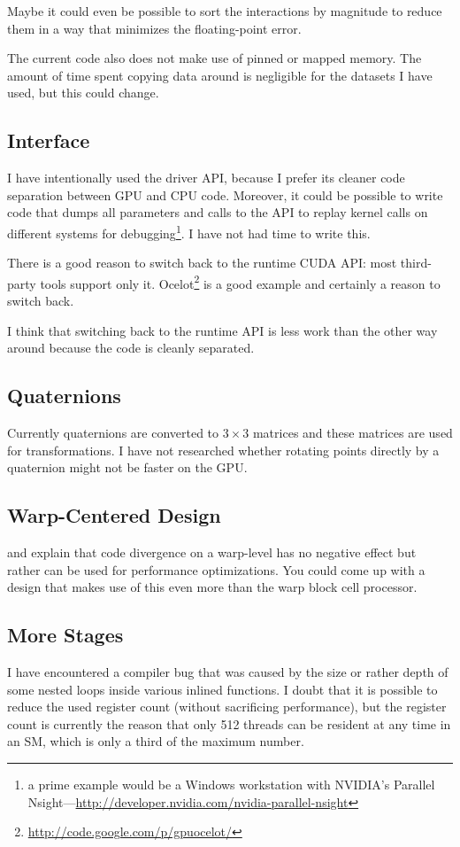Maybe it could even be possible to sort the interactions by magnitude to reduce them in a way that minimizes the floating-point error.

The current code also does not make use of pinned or mapped memory. The amount of time spent copying data around is negligible for the datasets I have used, but this could change.

\subsection{\cuda{} Interface}
I have intentionally used the driver API, because I prefer its cleaner code separation between GPU and CPU code. Moreover, it could be possible to write code that dumps all parameters and calls to the API to replay kernel calls on different systems for debugging\footnote{a prime example would be a Windows workstation with NVIDIA's Parallel Nsight---\url{http://developer.nvidia.com/nvidia-parallel-nsight}}. I have not had time to write this.

There is a good reason to switch back to the runtime CUDA API: most third-party tools support only it. Ocelot\footnote{\url{http://code.google.com/p/gpuocelot/}} is a good example and certainly a reason to switch back.

I think that switching back to the runtime API is less work than the other way around because the code is cleanly separated.

\subsection{Quaternions}
Currently quaternions are converted to $3 \times 3$ matrices and these matrices are used for transformations. I have not researched whether rotating points directly by a quaternion might not be faster on the GPU.

\subsection{Warp-Centered Design}
\cite{cudaDMA} and \cite{DBLP:conf/ispass/WongPSM10} explain that code divergence on a warp-level has no negative effect but rather can be used for performance optimizations.
You could come up with a design that makes use of this even more than the warp block cell processor.

\subsection{More Stages}
I have encountered a compiler bug that was caused by the size or rather depth of some nested loops inside various inlined functions. I doubt that it is possible to reduce the used register count (without sacrificing performance), but the register count is currently the reason that only 512 threads can be resident at any time in an SM, which is only a third of the maximum number.

